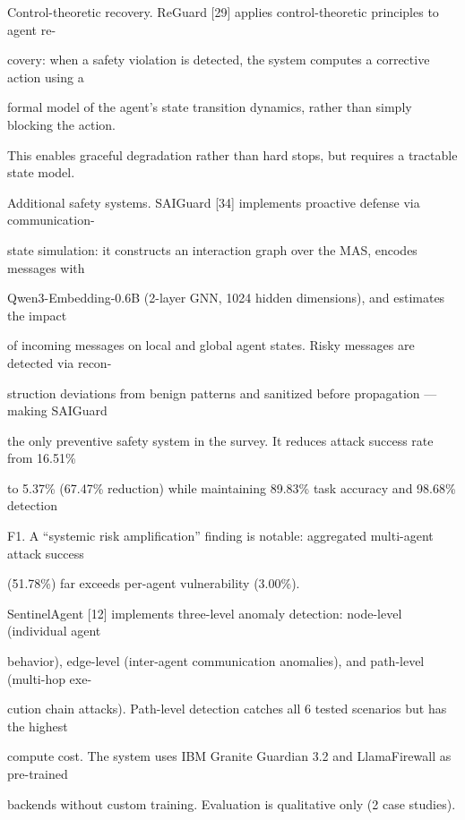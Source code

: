 \begin{flushleft}
\par\smallskip
\noindent Control-theoretic recovery. ReGuard [29] applies control-theoretic principles to agent re-\par
\noindent covery: when a safety violation is detected, the system computes a corrective action using a\par
\noindent formal model of the agent’s state transition dynamics, rather than simply blocking the action.\par
\noindent This enables graceful degradation rather than hard stops, but requires a tractable state model.\par
\par\smallskip
\noindent Additional safety systems. SAIGuard [34] implements proactive defense via communication-\par
\noindent state simulation: it constructs an interaction graph over the MAS, encodes messages with\par
\noindent Qwen3-Embedding-0.6B (2-layer GNN, 1024 hidden dimensions), and estimates the impact\par
\noindent of incoming messages on local and global agent states. Risky messages are detected via recon-\par
\noindent struction deviations from benign patterns and sanitized before propagation — making SAIGuard\par
\noindent the only preventive safety system in the survey. It reduces attack success rate from 16.51\%\par
\noindent to 5.37\% (67.47\% reduction) while maintaining 89.83\% task accuracy and 98.68\% detection\par
\noindent F1. A “systemic risk amplification” finding is notable: aggregated multi-agent attack success\par
\noindent (51.78\%) far exceeds per-agent vulnerability (3.00\%).\par
\noindent  SentinelAgent [12] implements three-level anomaly detection: node-level (individual agent\par
\noindent behavior), edge-level (inter-agent communication anomalies), and path-level (multi-hop exe-\par
\noindent cution chain attacks). Path-level detection catches all 6 tested scenarios but has the highest\par
\noindent compute cost. The system uses IBM Granite Guardian 3.2 and LlamaFirewall as pre-trained\par
\noindent backends without custom training. Evaluation is qualitative only (2 case studies).\par

\end{flushleft}
